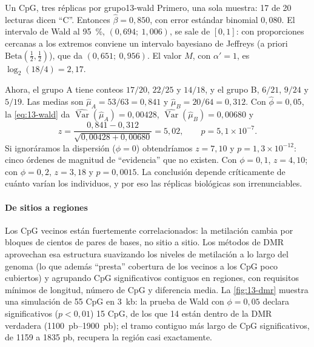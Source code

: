 \begin{ejemplo}{Un CpG, tres réplicas por grupo}{13-wald}
Primero, una sola muestra: 17 de 20 lecturas dicen ``C''. Entonces $\hat\beta=0{,}850$, con error estándar binomial $0{,}080$. El intervalo de Wald al \SI{95}{\percent}, $(0{,}694;\ 1{,}006)$, se sale de $[0,1]$: con proporciones cercanas a los extremos conviene un intervalo bayesiano de Jeffreys (a priori $\mathrm{Beta}(\tfrac12,\tfrac12)$), que da $(0{,}651;\ 0{,}956)$. El valor $M$, con $\alpha'=1$, es $\log_2(18/4)=2{,}17$.

Ahora, el grupo A tiene conteos $17/20$, $22/25$ y $14/18$, y el grupo B, $6/21$, $9/24$ y $5/19$. Las medias son $\hat\mu_A=53/63=0{,}841$ y $\hat\mu_B=20/64=0{,}312$. Con $\hat\phi=0{,}05$, la \cref{eq:13-wald} da $\widehat{\operatorname{Var}}(\hat\mu_A)=0{,}00428$, $\widehat{\operatorname{Var}}(\hat\mu_B)=0{,}00680$ y
\[
z=\frac{0{,}841-0{,}312}{\sqrt{0{,}00428+0{,}00680}} = 5{,}02,\qquad p = 5{,}1\times10^{-7}.
\]
Si ignoráramos la dispersión ($\phi=0$) obtendríamos $z=7{,}10$ y $p=1{,}3\times10^{-12}$: cinco órdenes de magnitud de ``evidencia'' que no existen. Con $\phi=0{,}1$, $z=4{,}10$; con $\phi=0{,}2$, $z=3{,}18$ y $p=0{,}0015$. La conclusión depende críticamente de cuánto varían los individuos, y por eso las réplicas biológicas son irrenunciables.
\end{ejemplo}


\paragraph{De sitios a regiones} Los CpG vecinos están fuertemente correlacionados: la metilación cambia por bloques de cientos de pares de bases, no sitio a sitio. Los métodos de DMR aprovechan esa estructura suavizando los niveles de metilación a lo largo del genoma (lo que además ``presta'' cobertura de los vecinos a los CpG poco cubiertos) y agrupando CpG significativos contiguos en regiones, con requisitos mínimos de longitud, número de CpG y diferencia media. La \cref{fig:13-dmr} muestra una simulación de 55 CpG en \SI{3}{kb}: la prueba de Wald con $\phi=0{,}05$ declara significativos ($p<0{,}01$) 15 CpG, de los que 14 están dentro de la DMR verdadera (\SIrange{1100}{1900}{pb}); el tramo contiguo más largo de CpG significativos, de \num{1159} a \num{1835} pb, recupera la región casi exactamente.

